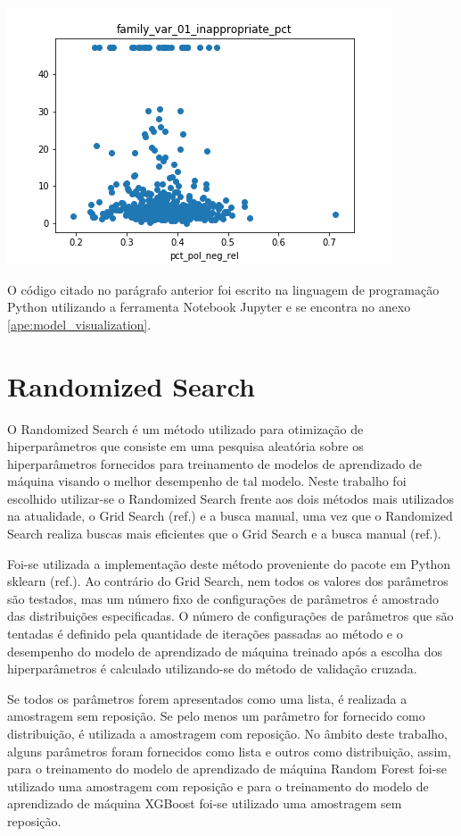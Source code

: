\graphicspath{ {./figuras/two_by_two_scatter_plot/} }
\includegraphics{04_family_var_01_inappropriate_pct}

O código citado no parágrafo anterior foi escrito na linguagem de programação Python utilizando a ferramenta Notebook Jupyter e se encontra no anexo \ref{ape:model_visualization}.

\section{Randomized Search}
\label{sec:randomized_search}

O Randomized Search é um método utilizado para otimização de hiperparâmetros que consiste em uma pesquisa aleatória sobre os hiperparâmetros fornecidos para treinamento de modelos de aprendizado de máquina visando o melhor desempenho de tal modelo. Neste trabalho foi escolhido utilizar-se o Randomized Search frente aos dois métodos mais utilizados na atualidade, o Grid Search (ref.) e a busca manual, uma vez que o Randomized Search realiza buscas mais eficientes que o Grid Search e a busca manual (ref.).

Foi-se utilizada a implementação deste método proveniente do pacote em Python sklearn (ref.). Ao contrário do Grid Search, nem todos os valores dos parâmetros são testados, mas um número fixo de configurações de parâmetros é amostrado das distribuições especificadas. O número de configurações de parâmetros que são tentadas é definido pela quantidade de iterações passadas ao método e o desempenho do modelo de aprendizado de máquina treinado após a escolha dos hiperparâmetros é calculado utilizando-se do método de validação cruzada.

Se todos os parâmetros forem apresentados como uma lista, é realizada a amostragem sem reposição. Se pelo menos um parâmetro for fornecido como distribuição, é utilizada a amostragem com reposição. No âmbito deste trabalho, alguns parâmetros foram fornecidos como lista e outros como distribuição, assim, para o treinamento do modelo de aprendizado de máquina Random Forest foi-se utilizado uma amostragem com reposição e para o treinamento do modelo de aprendizado de máquina XGBoost foi-se utilizado uma amostragem sem reposição.

